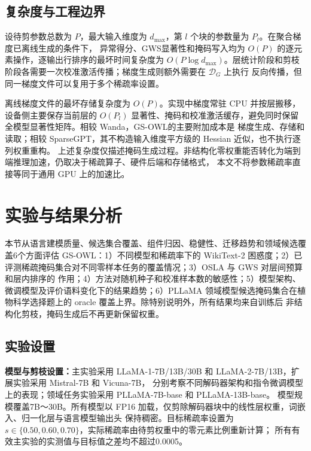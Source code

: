 \documentclass[UTF8,fontset=fandol]{ctexart}
\newcommand{\method}{GS-OWL}
\newcommand{\gws}{\textsc{GWS}}
\begin{document}
\subsection{复杂度与工程边界}

设待剪参数总数为 $P$，最大输入维度为 $d_{\max}$，第 $l$ 个块的参数量为 $P_l$。在聚合梯度已离线生成的条件下，
异常得分、\gws 显著性和掩码写入均为 $O(P)$ 的逐元素操作，逐输出行排序的最坏时间复杂度为
$O(P\log d_{\max})$。层统计阶段和剪枝阶段各需要一次校准激活传播；梯度生成则额外需要在 $\mathcal D_G$ 上执行
反向传播，但同一梯度文件可以复用于多个稀疏率设置。

离线梯度文件的最坏存储复杂度为 $O(P)$。实现中梯度常驻 CPU 并按层搬移，设备侧主要保存当前层的
$O(P_l)$ 显著性、掩码和校准激活缓存，避免同时保留全模型显著性矩阵。相较 Wanda，\method 的主要附加成本是
梯度生成、存储和读取；相较 SparseGPT，其不构造输入维度平方级的 Hessian 近似，也不执行逐列权重重构。
上述复杂度仅描述掩码生成过程。非结构化零权重能否转化为端到端推理加速，仍取决于稀疏算子、硬件后端和存储格式，
本文不将参数稀疏率直接等同于通用 GPU 上的加速比。

\section{实验与结果分析}

本节从语言建模质量、候选集合覆盖、组件归因、稳健性、迁移趋势和领域候选覆盖6个方面评估 \method：1）不同模型和稀疏率下的
WikiText-2 困惑度；2）已评测稀疏掩码集合对不同零样本任务的覆盖情况；3）OSLA 与 GWS 对层间预算和层内排序的
作用；4）方法对随机种子和校准样本数的敏感性；5）模型架构、微调模型及评价语料变化下的结果趋势；6）PLLaMA
领域模型候选掩码集合在植物科学选择题上的 oracle 覆盖上界。除特别说明外，所有结果均来自训练后
非结构化剪枝，掩码生成后不再更新保留权重。

\subsection{实验设置}

\textbf{模型与剪枝设置：}主实验采用 LLaMA-1-7B/13B/30B 和 LLaMA-2-7B/13B，扩展实验采用 Mistral-7B 和 Vicuna-7B，
分别考察不同解码器架构和指令微调模型上的表现；领域任务实验采用 PLLaMA-7B-base 和 PLLaMA-13B-base。
模型规模覆盖7B～30B。所有模型以 FP16 加载，仅剪除解码器块中的线性层权重，词嵌入、归一化层与语言模型输出头
保持稠密。目标稀疏率设置为 $s\in\{0.50,0.60,0.70\}$，实际稀疏率由待剪权重中的零元素比例重新计算；
所有有效主实验的实测值与目标值之差均不超过0.0005。
\end{document}
